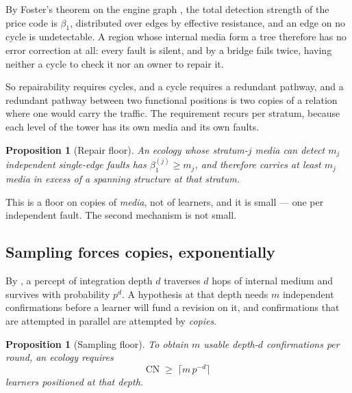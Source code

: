 \documentclass[11pt]{article}
\theoremstyle{plain}
\newtheorem{proposition}[theorem]{Proposition}
\theoremstyle{definition}
\theoremstyle{remark}
\newcommand{\CN}{\mathrm{CN}}
\newcommand{\bt}{\beta_1}
\begin{document}
By Foster's theorem on the engine graph \cite[\S6]{engine}, the total
detection strength of the price code is $\bt$, distributed over edges by
effective resistance, and an edge on no cycle is undetectable. A region
whose internal media form a tree therefore has no error correction at all:
every fault is silent, and by \cite[Cor.~7.3]{engine} a bridge fails twice,
having neither a cycle to check it nor an owner to repair it.

So repairability requires cycles, and a cycle requires a redundant
pathway, and a redundant pathway between two functional positions is
two copies of a relation where one would carry the traffic. The
requirement recurs per stratum, because each level of the tower has its
own media and its own faults.

\begin{proposition}[Repair floor]\label{sco:prop:repairfloor}
An ecology whose stratum-$j$ media can detect $m_j$ independent single-edge
faults has $\bt^{(j)} \ge m_j$, and therefore carries at least $m_j$ media
in excess of a spanning structure at that stratum.
\end{proposition}

This is a floor on copies of \emph{media}, not of learners, and it is
small --- one per independent fault. The second mechanism is not small.

\subsection{Sampling forces copies, exponentially}\label{sco:S7.2}

By \cite[Prop.~5.18]{engine}, a percept of integration depth $d$ traverses
$d$ hops of internal medium and survives with probability $p^d$. A
hypothesis at that depth needs $m$ independent confirmations before a
learner will fund a revision on it, and confirmations that are attempted
in parallel are attempted by \emph{copies}.

\begin{proposition}[Sampling floor]\label{sco:prop:sampfloor}
To obtain $m$ usable depth-$d$ confirmations per round, an ecology requires
\[
  \CN \;\ge\; \bigl\lceil m\, p^{-d} \bigr\rceil
\]
learners positioned at that depth.
\end{proposition}
\end{document}
